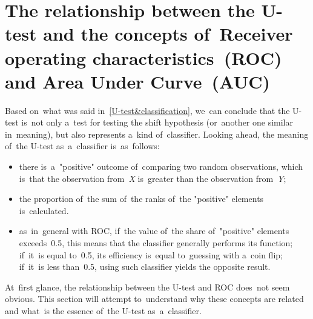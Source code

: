 \documentclass[]{scrreprt}
\begin{document}
\section{The relationship between the U-test and the concepts of~Receiver operating characteristics~(ROC) and Area Under Curve~(AUC)}\label{U-AUC}
Based on~what was said in~\ref{U-test&classification}, we~can conclude that the U-test is~not only a~test for testing the shift hypothesis (or~another one similar in~meaning), but also represents a~kind of~classifier. Looking ahead, the meaning of~the U-test as~a~classifier is~as~follows:
\begin{itemize}
	\item there is~a~"positive" outcome of~comparing two random observations, which is~that the observation from~\textit{X} is~greater than the observation from~\textit{Y};
	\item the proportion of~the sum of~the ranks of~the "positive" elements is~calculated.
	\item as~in~general with ROC, if~the value of~the share of~"positive" elements exceeds~0.5, this means that the classifier generally performs its function; if~it~is equal to~0.5, its efficiency is~equal to~guessing with a~coin flip; if~it~is less than~0.5, using such classifier yields the opposite result.	 
\end{itemize}
At~first glance, the relationship between the U-test and ROC does~not seem obvious. This section will attempt to~understand why these concepts are related and what~is the essence of~the U-test as~a~classifier.
\end{document}
